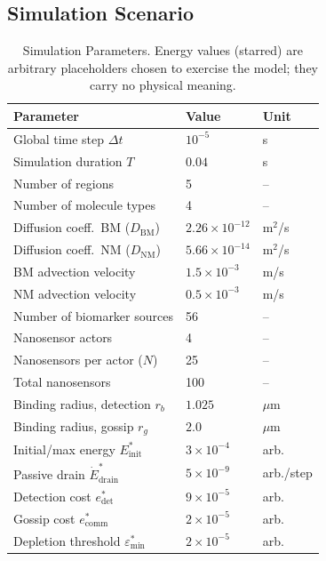 \documentclass[journal]{IEEEtran}
\begin{document}
\subsection{Simulation Scenario}

\begin{table}[!t]
\renewcommand{\arraystretch}{1.3}
\caption{Simulation Parameters. Energy values (starred) are arbitrary
placeholders chosen to exercise the model; they carry no physical meaning.}
\label{tab:params}
\centering
\begin{tabular}{lll}
\hline
\textbf{Parameter} & \textbf{Value} & \textbf{Unit} \\
\hline
Global time step $\Delta t$ & $10^{-5}$ & s \\
Simulation duration $T$ & $0.04$ & s \\
Number of regions & 5 & -- \\
Number of molecule types & 4 & -- \\
Diffusion coeff.\ BM ($D_\mathrm{BM}$) & $2.26 \times 10^{-12}$ & m$^2$/s \\
Diffusion coeff.\ NM ($D_\mathrm{NM}$) & $5.66 \times 10^{-14}$ & m$^2$/s \\
BM advection velocity & $1.5 \times 10^{-3}$ & m/s \\
NM advection velocity & $0.5 \times 10^{-3}$ & m/s \\
Number of biomarker sources & 56 & -- \\
Nanosensor actors & 4 & -- \\
Nanosensors per actor ($N$) & 25 & -- \\
Total nanosensors & 100 & -- \\
Binding radius, detection $r_b$ & $1.025$ & $\mu$m \\
Binding radius, gossip $r_g$ & $2.0$ & $\mu$m \\
Initial/max energy $E_\mathrm{init}^*$ & $3 \times 10^{-4}$ & arb. \\
Passive drain $\dot{E}_\mathrm{drain}^*$ & $5 \times 10^{-9}$ & arb./step \\
Detection cost $e_\mathrm{det}^*$ & $9 \times 10^{-5}$ & arb. \\
Gossip cost $e_\mathrm{comm}^*$ & $2 \times 10^{-5}$ & arb. \\
Depletion threshold $\varepsilon_\mathrm{min}^*$ & $2 \times 10^{-5}$ & arb. \\
\hline
\end{tabular}
\end{table}
\end{document}
